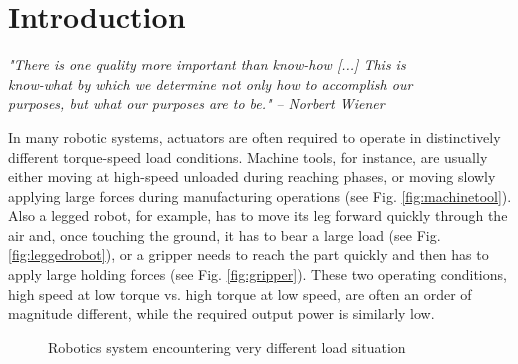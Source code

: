 \chapter{Introduction}
\label{sec:Introduction}

{
\begin{flushright}
\textit{"There is one quality more important than know-how [...] This is \\ know-what by which we determine not only how to accomplish our \\  purposes, but what our purposes are to be."} 
\emph{-- Norbert Wiener}
\end{flushright}
}
\vspace{10pt}





In many robotic systems, actuators are often required to operate in distinctively different torque-speed load conditions. Machine tools, for instance, are usually either moving at high-speed unloaded during reaching phases, or moving slowly applying large forces during manufacturing operations (see Fig. \ref{fig:machinetool}). Also a legged robot, for example, has to move its leg forward quickly through the air and, once touching the ground, it has to bear a large load (see Fig. \ref{fig:leggedrobot}), or a gripper needs to reach the part quickly and then has to apply large holding forces (see Fig. \ref{fig:gripper}). These two operating conditions, high speed at low torque vs. high torque at low speed, are often an order of magnitude different, while the required output power is similarly low.

%
\begin{figure}[H]
				\vspace{-10pt}
        \centering
        \caption{Robotics system encountering very different load situation}
				\label{fig:app}
\end{figure}

